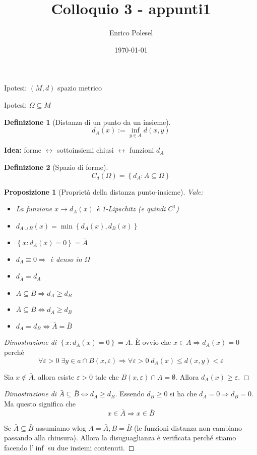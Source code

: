\documentclass[a4paper,10pt]{article}
\title{Colloquio 3 - appunti1}
\author{Enrico Polesel}
\date{\today}
\theoremstyle{plain}
\newtheorem{mypro}{Proposizione}[section]
\theoremstyle{definition}
\newtheorem{mydef}{Definizione}[section]
\theoremstyle{remark}
\newcommand{\set}[1]{\left\{#1\right\}}
\begin{document}
\maketitle

Ipotesi: $(M,d)$ spazio metrico

Ipotesi: $\Omega \subseteq M$

\begin{mydef}[Distanza di un punto da un insieme]
\[  d_A (x) := \inf _{y \in A} d(x,y) \] 
\end{mydef}

\textbf{Idea:} forme $\leftrightarrow$ sottoinsiemi chiusi
$\leftrightarrow$ funzioni $d_A$

\begin{mydef}[Spazio di forme]
  \[ C_d(\Omega) = \set{d_A : A \subseteq \Omega} \]
\end{mydef}

\begin{mypro}[Proprietà della distanza punto-insieme]
  Vale:
  \begin{itemize}
  \item La funzione $x \rightarrow d_A(x)$ è 1-Lipschitz (e quindi
    $C^1$)
  \item $d_{A\cup B}(x) = \min\set{d_A(x),d_B(x)}$
  \item $\set{x:d_A(x) = 0} = \bar A$
  \item $d_A \equiv 0 \Rightarrow $ è denso in $\Omega$
  \item $d_{\bar A} = d_A$
  \item $A\subseteq B \Rightarrow d_A \ge d_B$
  \item $\bar A \subseteq \bar B \Leftrightarrow d_A \ge d_B$
  \item $d_A = d_B \Leftrightarrow \bar A = \bar B$
  \end{itemize}
\end{mypro}
\begin{proof} [Dimostrazione di $\set{x:d_A(x) = 0} = \bar A$]
  \`E ovvio che $x\in \bar A \Rightarrow d_A(x) = 0$ perché 
  \[ \forall \varepsilon > 0\; \exists y \in a \cap B(x,\varepsilon)
  \Rightarrow \forall \varepsilon > 0 \; d_A(x) \le d(x,y) <
  \varepsilon \]

  Sia $x\not\in \bar A$, allora esiste $\varepsilon>0$ tale che
  $B(x,\varepsilon) \cap A = \emptyset$. Allora $d_A(x) \ge
  \varepsilon$.
\end{proof}

\begin{proof}[Dimostrazione di $\bar A \subseteq \bar B
  \Leftrightarrow d_A \ge d_B$]
  Essendo $d_B \ge 0$ si ha che $d_A = 0 \Rightarrow d_B = 0$. Ma
  questo significa che 
  \[ x \in \bar A \Rightarrow x \in \bar B \]

  Se $\bar A \subseteq \bar B$ assumiamo wlog $A = \bar A, B = \bar B$
  (le funzioni distanza non cambiano passando alla chiusura). Allora
  la disuguaglianza è verificata perché stiamo facendo l'$\inf$ su due
  insiemi contenuti.  
\end{proof}
\end{document}
